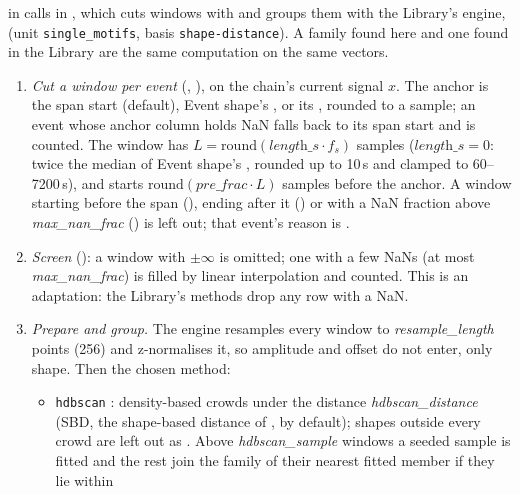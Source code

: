  in  calls 
in , which cuts windows with
 and groups them with the Library's engine,
 (unit \texttt{single\_motifs}, basis
\texttt{shape-distance}). A family found here and one found in the Library are the same
computation on the same vectors.

\begin{enumerate}
\item \emph{Cut a window per event} (, ), on the chain's
  current signal $x$. The anchor is the span start (default), Event shape's
  , or its , rounded to a sample; an event whose anchor
  column holds NaN falls back to its span start and is counted. The window has
  $L = \mathrm{round}(\textit{length\_s}\cdot f_s)$ samples ($\textit{length\_s} = 0$: twice
  the median of Event shape's , rounded up to 10\,s and clamped to
  60--7200\,s), and starts $\mathrm{round}(\textit{pre\_frac}\cdot L)$ samples before the
  anchor. A window starting before the span (), ending after it
  () or with a NaN fraction above \emph{max\_nan\_frac}
  () is left out; that event's reason is .
\item \emph{Screen} (): a window with $\pm\infty$ is omitted; one with a few
  NaNs (at most \emph{max\_nan\_frac}) is filled by linear interpolation and counted. This is
  an adaptation: the Library's methods drop any row with a NaN.
\item \emph{Prepare and group.} The engine resamples every window to
  \emph{resample\_length} points (256) and z-normalises it, so amplitude and offset do not
  enter, only shape. Then the chosen method:
  \begin{itemize}
  \item \texttt{hdbscan} \citep{campello2013density}: density-based crowds under the
    distance \emph{hdbscan\_distance} (SBD, the shape-based distance of
    \citet{paparrizos2015kshape}, by default); shapes outside every crowd are left out as
    . Above \emph{hdbscan\_sample} windows a seeded sample is
    fitted and the rest join the family of their nearest fitted member if they lie within

\end{itemize}
\end{enumerate}

